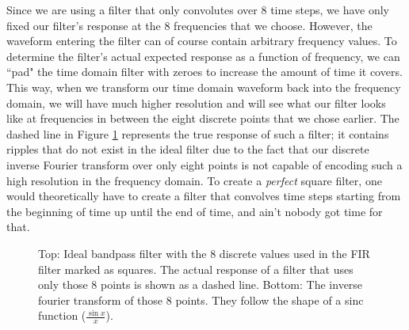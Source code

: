 \documentclass[12pt]{article}
\begin{document}
Since we are using a filter that only convolutes over 8 time steps, we have only fixed our filter's response at the 8 frequencies that we choose. However, the waveform entering the filter can of course contain arbitrary frequency values. To determine the filter's actual expected response as a function of frequency, we can ``pad" the time domain filter with zeroes to increase the amount of time it covers. This way, when we transform our time domain waveform back into the frequency domain, we will have much higher resolution and will see what our filter looks like at frequencies in between the eight discrete points that we chose earlier. The dashed line in Figure \ref{fig:fir} represents the true response of such a filter; it contains ripples that do not exist in the ideal filter due to the fact that our discrete inverse Fourier transform over only eight points is not capable of encoding such a high resolution in the frequency domain. To create a \textit{perfect} square filter, one would theoretically have to create a filter that convolves time steps starting from the beginning of time up until the end of time, and ain't nobody got time for that.
\begin{figure}[H]
  
\caption[SODUMB]{Top: Ideal bandpass filter with the 8 discrete values used in the FIR filter marked as squares. The actual response of a filter that uses only those 8 points is shown as a dashed line. Bottom: The inverse fourier transform of those 8 points. They follow the shape of a sinc function ($\frac{\sin{x}}{x}$).}
\label{fig:fir}
\end{figure}
\end{document}

